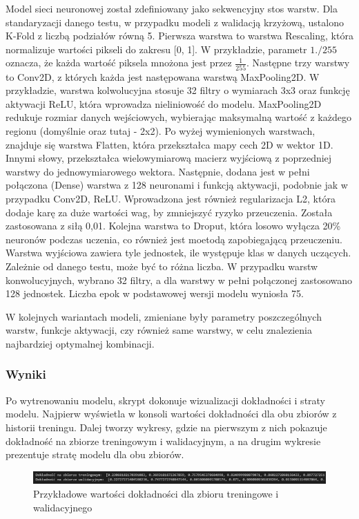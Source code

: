 Model sieci neuronowej został zdefiniowany jako sekwencyjny stos warstw.
Dla standaryzacji danego testu, w przypadku modeli z walidacją krzyżową, ustalono K-Fold z liczbą podziałów równą 5.
Pierwsza warstwa to warstwa Rescaling, która normalizuje wartości pikseli do zakresu [0, 1].
W przykładzie, parametr $1./255$ oznacza, że każda wartość piksela mnożona jest przez $\frac{1}{255}$.
Następne trzy warstwy to Conv2D, z których każda jest następowana warstwą MaxPooling2D.
W przykładzie, warstwa kolwolucyjna stosuje 32 filtry o wymiarach 3x3 oraz funkcję aktywacji ReLU,
która wprowadza nieliniowość do modelu.
MaxPooling2D redukuje rozmiar danych wejściowych,
wybierając maksymalną wartość z każdego regionu (domyślnie oraz tutaj - 2x2). 
Po wyżej wymienionych warstwach, znajduje się warstwa Flatten, która przekształca mapy cech 2D w wektor 1D.
Innymi słowy, przekształca wielowymiarową macierz wyjściową z poprzedniej warstwy do jednowymiarowego wektora.
Następnie, dodana jest w pełni połączona (Dense) warstwa z 128 neuronami
i funkcją aktywacji, podobnie jak w przypadku Conv2D, ReLU.
Wprowadzona jest również regularizacja L2, która dodaje karę za duże wartości wag,
by zmniejszyć ryzyko przeuczenia. Została zastosowana z siłą 0,01.
Kolejna warstwa to Droput, która losowo wyłącza 20\% neuronów podczas uczenia,
co również jest moetodą zapobiegającą przeuczeniu.
Warstwa wyjściowa zawiera tyle jednostek, ile występuje klas w danych uczących.
Zależnie od danego testu, może być to różna liczba.
W przypadku warstw konwolucyjnych, wybrano 32 filtry, a dla warstwy w pełni połączonej zastosowano 128 jednostek.
Liczba epok w podstawowej wersji modelu wyniosła 75.

W kolejnych wariantach modeli, zmieniane były parametry poszczególnych warstw, funkcje aktywacji,
czy również same warstwy, w celu znalezienia najbardziej optymalnej kombinacji.

\subsubsection{Wyniki}
Po wytrenowaniu modelu, skrypt dokonuje wizualizacji dokładności i straty modelu.
Najpierw wyświetla w konsoli wartości dokładności dla obu zbiorów z historii treningu.
Dalej tworzy wykresy, gdzie na pierwszym z nich pokazuje dokładność na zbiorze treningowym i walidacyjnym,
a na drugim wykresie prezentuje stratę modelu dla obu zbiorów.

\begin{figure}[ht]
	\centering
	\includegraphics[width=15cm]{resources/model/images/scr-standard-result.png}
	\caption{Przykładowe wartości dokładności dla zbioru treningowe i walidacyjnego}
	\label{Fig:tests-wyniki-2}
\end{figure}
\FloatBarrier

